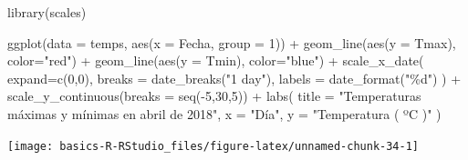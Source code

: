 \documentclass[
  degree=mecinf,
  title=normal,
  toc=normal,
  bib=normal]{mnye}
\newenvironment{Shaded}{\begin{snugshade}}{\end{snugshade}}
\newcommand{\AttributeTok}[1]{\textcolor[rgb]{0.77,0.63,0.00}{#1}}
\newcommand{\DecValTok}[1]{\textcolor[rgb]{0.00,0.00,0.81}{#1}}
\newcommand{\FunctionTok}[1]{\textcolor[rgb]{0.00,0.00,0.00}{#1}}
\newcommand{\NormalTok}[1]{#1}
\newcommand{\SpecialCharTok}[1]{\textcolor[rgb]{0.00,0.00,0.00}{#1}}
\newcommand{\StringTok}[1]{\textcolor[rgb]{0.31,0.60,0.02}{#1}}
\begin{document}
\begin{Shaded}
\begin{Highlighting}[]
\FunctionTok{library}\NormalTok{(scales)}

\FunctionTok{ggplot}\NormalTok{(}\AttributeTok{data =}\NormalTok{ temps, }\FunctionTok{aes}\NormalTok{(}\AttributeTok{x =}\NormalTok{ Fecha, }\AttributeTok{group =} \DecValTok{1}\NormalTok{)) }\SpecialCharTok{+} 
    \FunctionTok{geom\_line}\NormalTok{(}\FunctionTok{aes}\NormalTok{(}\AttributeTok{y =}\NormalTok{ Tmax), }\AttributeTok{color=}\StringTok{"red"}\NormalTok{) }\SpecialCharTok{+} 
    \FunctionTok{geom\_line}\NormalTok{(}\FunctionTok{aes}\NormalTok{(}\AttributeTok{y =}\NormalTok{ Tmin), }\AttributeTok{color=}\StringTok{"blue"}\NormalTok{) }\SpecialCharTok{+} 
    \FunctionTok{scale\_x\_date}\NormalTok{(}
        \AttributeTok{expand=}\FunctionTok{c}\NormalTok{(}\DecValTok{0}\NormalTok{,}\DecValTok{0}\NormalTok{),}
        \AttributeTok{breaks =} \FunctionTok{date\_breaks}\NormalTok{(}\StringTok{"1 day"}\NormalTok{), }
        \AttributeTok{labels =} \FunctionTok{date\_format}\NormalTok{(}\StringTok{"\%d"}\NormalTok{)}
\NormalTok{    ) }\SpecialCharTok{+}
    \FunctionTok{scale\_y\_continuous}\NormalTok{(}\AttributeTok{breaks =} \FunctionTok{seq}\NormalTok{(}\SpecialCharTok{{-}}\DecValTok{5}\NormalTok{,}\DecValTok{30}\NormalTok{,}\DecValTok{5}\NormalTok{)) }\SpecialCharTok{+} 
    \FunctionTok{labs}\NormalTok{(}
        \AttributeTok{title =} \StringTok{"Temperaturas máximas y mínimas en abril de 2018"}\NormalTok{,}
        \AttributeTok{x =} \StringTok{"Día"}\NormalTok{,}
        \AttributeTok{y =} \StringTok{"Temperatura ( ºC )"}
\NormalTok{    )}
\end{Highlighting}
\end{Shaded}

\begin{center}\texttt{[image: basics-R-RStudio\_files/figure-latex/unnamed-chunk-34-1]} \end{center}

\end{document}
